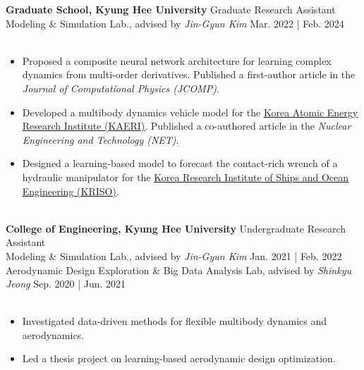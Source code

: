 \documentclass[a4paper,10pt]{extarticle}
\begin{document}
\noindent\textbf{Graduate School, Kyung Hee University} \hfill Graduate Research Assistant\\
Modeling \& Simulation Lab., advised by \textsl{Jin-Gyun Kim} \hfill Mar. 2022 | Feb. 2024\\
\vspace*{-0.25cm}\\
\begin{minipage}{0.77\textwidth}
	\footnotesize
	\begin{itemize}
		\item Proposed a composite neural network architecture for learning complex dynamics from multi-order derivatives. Published a first-author article in the \textit{Journal of Computational Physics (JCOMP)}.
		\item Developed a multibody dynamics vehicle model for the \href{https://www.kaeri.re.kr/eng/}{\ul{Korea Atomic Energy Research Institute (KAERI)}}. Published a co-authored article in the \textit{Nuclear Engineering and Technology (NET)}.
		\item Designed a learning-based model to forecast the contact-rich wrench of a hydraulic manipulator for the \href{https://www.kriso.re.kr/eng/}{\ul{Korea Research Institute of Ships and Ocean Engineering (KRISO)}}.
		
		
	\end{itemize}
\end{minipage}\\

\vspace*{0.1cm}
\noindent\textbf{College of Engineering, Kyung Hee University} \hfill Undergraduate Research Assistant\\
Modeling \& Simulation Lab., advised by \textsl{Jin-Gyun Kim} \hfill Jan. 2021 | Feb. 2022\\
Aerodynamic Design Exploration \& Big Data Analysis Lab, advised by \textsl{Shinkyu Jeong} \hfill Sep. 2020 | Jun. 2021\\
\vspace*{-0.25cm}\\
\begin{minipage}{0.77\textwidth}
	\footnotesize
	\begin{itemize}
		\item Investigated data-driven methods for flexible multibody dynamics and aerodynamics. 
		\item Led a thesis project on learning-based aerodynamic design optimization.
	\end{itemize}
\end{minipage}\\
\vspace*{-0.2cm}
\end{document}
